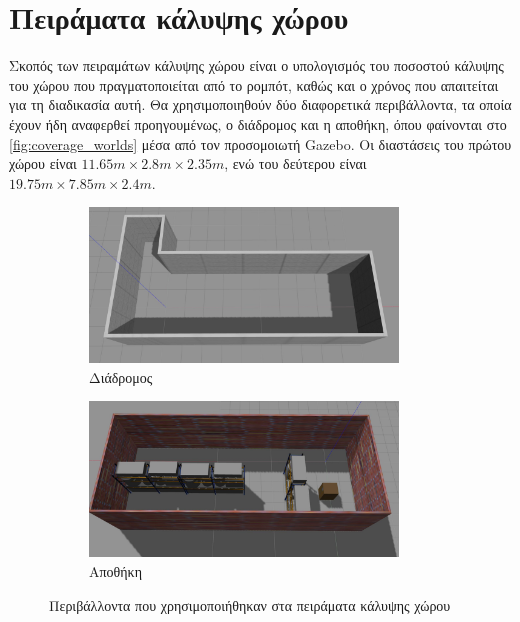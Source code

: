 \section{Πειράματα κάλυψης χώρου}
\label{section:coverage_tests}

Σκοπός των πειραμάτων κάλυψης χώρου είναι ο υπολογισμός του ποσοστού κάλυψης του χώρου που πραγματοποιείται από το ρομπότ, καθώς και ο χρόνος που απαιτείται για τη διαδικασία αυτή. Θα χρησιμοποιηθούν δύο διαφορετικά περιβάλλοντα, τα οποία έχουν ήδη αναφερθεί προηγουμένως, ο διάδρομος και η αποθήκη, όπου φαίνονται στο \autoref{fig:coverage_worlds} μέσα από τον προσομοιωτή Gazebo. Οι διαστάσεις του πρώτου χώρου είναι $11.65\si{m} \times 2.8\si{m} \times 2.35\si{m}$, ενώ του δεύτερου είναι $19.75\si{m} \times 7.85\si{m} \times 2.4\si{m}$.

\begin{figure}[!ht]
        \begin{subfigure}{0.5\textwidth}
            \includegraphics[width=0.9\textwidth]{./images/chapter6/corridor.jpg}
                \caption{Διάδρομος}
             \label{fig:corridor}
        \end{subfigure}
        \begin{subfigure}{0.5\textwidth}
            \includegraphics[width=0.9\textwidth]{./images/chapter6/warehouse.jpg}
            \caption{Αποθήκη}
            \label{fig:warehouse}
        \end{subfigure}
        \caption{Περιβάλλοντα που χρησιμοποιήθηκαν στα πειράματα κάλυψης χώρου}
        \label{fig:coverage_worlds}
\end{figure} 

